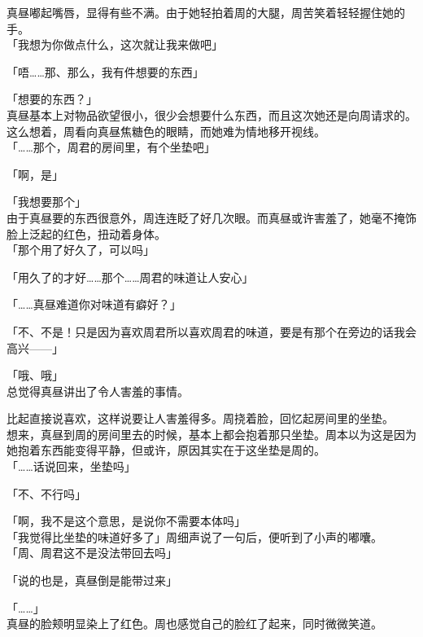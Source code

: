 真昼嘟起嘴唇，显得有些不满。由于她轻拍着周的大腿，周苦笑着轻轻握住她的手。\\

「我想为你做点什么，这次就让我来做吧」

「唔……那、那么，我有件想要的东西」

「想要的东西？」\\

真昼基本上对物品欲望很小，很少会想要什么东西，而且这次她还是向周请求的。这么想着，周看向真昼焦糖色的眼睛，而她难为情地移开视线。\\

「……那个，周君的房间里，有个坐垫吧」

「啊，是」

「我想要那个」\\

由于真昼要的东西很意外，周连连眨了好几次眼。而真昼或许害羞了，她毫不掩饰脸上泛起的红色，扭动着身体。\\

「那个用了好久了，可以吗」

「用久了的才好……那个……周君的味道让人安心」

「……真昼难道你对味道有癖好？」

「不、不是！只是因为喜欢周君所以喜欢周君的味道，要是有那个在旁边的话我会高兴——」

「哦、哦」\\

总觉得真昼讲出了令人害羞的事情。

比起直接说喜欢，这样说要让人害羞得多。周挠着脸，回忆起房间里的坐垫。\\

想来，真昼到周的房间里去的时候，基本上都会抱着那只坐垫。周本以为这是因为她抱着东西能变得平静，但或许，原因其实在于这坐垫是周的。\\

「……话说回来，坐垫吗」

「不、不行吗」

「啊，我不是这个意思，是说你不需要本体吗」\\

「我觉得比坐垫的味道好多了」周细声说了一句后，便听到了小声的嘟囔。\\

「周、周君这不是没法带回去吗」

「说的也是，真昼倒是能带过来」

「……」\\

真昼的脸颊明显染上了红色。周也感觉自己的脸红了起来，同时微微笑道。\\

